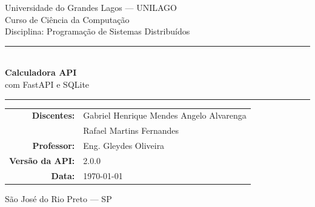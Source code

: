 \documentclass[12pt, a4paper]{article}
\begin{document}
\begin{titlepage}
  \centering
  \vspace*{2cm}

  {\large Universidade do Grandes Lagos — UNILAGO}\\[0.3cm]
  {\large Curso de Ciência da Computação}\\[0.3cm]
  {\large Disciplina: Programação de Sistemas Distribuídos}

  \vspace{2cm}
  \rule{\linewidth}{2pt}\\[0.4cm]
  {\Huge\bfseries\color{accent} Calculadora API}\\[0.3cm]
  {\Large com FastAPI e SQLite}\\[0.2cm]
  \rule{\linewidth}{2pt}

  \vspace{1.5cm}

  \begin{tabular}{rl}
    \textbf{Discentes:} & Gabriel Henrique Mendes Angelo Alvarenga \\
                        & Rafael Martins Fernandes \\[0.6cm]
    \textbf{Professor:} & Eng. Gleydes Oliveira \\[0.6cm]
    \textbf{Versão da API:} & 2.0.0 \\[0.3cm]
    \textbf{Data:}      & \today
  \end{tabular}

  \vfill
  {\small São José do Rio Preto — SP}
\end{titlepage}

\begin{abstract}
\noindent
Este artigo documenta o desenvolvimento de uma API RESTful de calculadora utilizando o framework FastAPI em Python, como projeto avaliativo da disciplina de Programação de Sistemas Distribuídos. A solução implementa as quatro operações matemáticas básicas — soma, subtração, multiplicação e divisão —, além de potenciação e raiz quadrada. Como evolução em relação ao nível básico proposto, foram incorporados recursos de nível intermediário: persistência de histórico de cálculos por usuário com banco de dados SQLite, habilitação de CORS para comunicação com frontend, e um total de seis operações disponíveis. A interface web foi desenvolvida em HTML e JavaScript puro, consumindo três ou mais endpoints da API. A documentação automática via Swagger UI e o tratamento adequado de códigos de status HTTP são também abordados.

\vspace{0.5em}
\noindent\textbf{Palavras-chave:} FastAPI, API REST, Sistemas Distribuídos, SQLite, Python, CORS.
\end{abstract}
\end{document}
